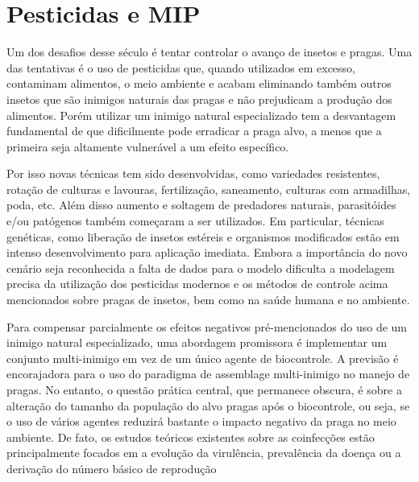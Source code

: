 \section{Pesticidas e MIP}

Um dos desafios desse século é tentar controlar o avanço de insetos e pragas. Uma das tentativas é o uso de pesticidas que, quando utilizados em excesso, contaminam alimentos, o meio ambiente e acabam eliminando também outros insetos que são inimigos naturais das pragas e não prejudicam a produção dos alimentos. Porém utilizar um inimigo natural especializado tem a desvantagem fundamental de que dificilmente pode erradicar a praga alvo, a menos que a primeira seja altamente vulnerável a um efeito específico. 

Por isso novas técnicas tem sido desenvolvidas, como variedades resistentes, rotação de culturas e lavouras, fertilização, saneamento, culturas com armadilhas, poda, etc. Além disso aumento e soltagem de predadores naturais, parasitóides e/ou patógenos também começaram a ser utilizados. Em particular, técnicas genéticas, como liberação de insetos estéreis e organismos modificados estão em intenso desenvolvimento para aplicação imediata. Embora a importância do novo cenário seja reconhecida a falta de dados para o modelo dificulta a modelagem precisa da utilização dos pesticidas modernos e os métodos de controle acima mencionados sobre pragas de insetos, bem como na saúde humana e no ambiente. 

Para compensar parcialmente os efeitos negativos pré-mencionados do uso de um inimigo natural especializado, uma abordagem promissora é implementar um conjunto multi-inimigo em vez de um único agente de biocontrole. A previsão é encorajadora para o uso do paradigma de assemblage multi-inimigo no manejo de pragas. No entanto, o
questão prática central, que permanece obscura, é sobre a alteração do tamanho da população do alvo
pragas após o biocontrole, ou seja, se o uso de vários agentes reduzirá bastante o impacto negativo
da praga no meio ambiente. De fato, os estudos teóricos existentes sobre as coinfecções estão principalmente focados em
a evolução da virulência, prevalência da doença ou a derivação do número básico de reprodução

